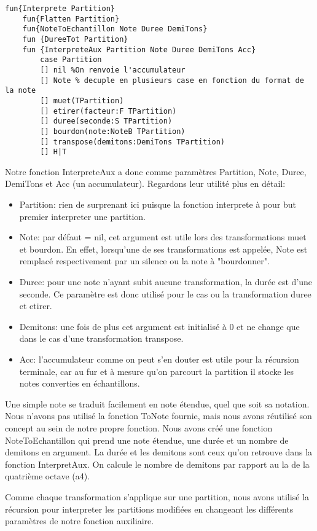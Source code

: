 \documentclass[a4paper,12pt]{report}
\begin{document}
\begin{lstlisting}[frame=single] 
fun{Interprete Partition}
	fun{Flatten Partition}
	fun{NoteToEchantillon Note Duree DemiTons}
	fun {DureeTot Partition}
	fun {InterpreteAux Partition Note Duree DemiTons Acc}
		case Partition
		[] nil %On renvoie l'accumulateur
		[] Note % decuple en plusieurs case en fonction du format de la note
		[] muet(TPartition)
		[] etirer(facteur:F TPartition)
		[] duree(seconde:S TPartition)
		[] bourdon(note:NoteB TPartition)
		[] transpose(demitons:DemiTons TPartition)
		[] H|T			
\end{lstlisting}

Notre fonction InterpreteAux a donc comme paramètres Partition, Note, Duree, DemiTons et Acc (un accumulateur). Regardons leur utilité plus en détail:
\begin{itemize}
\item Partition: rien de surprenant ici puisque la fonction interprete à pour but premier interpreter une partition. 
\item Note: par défaut = nil, cet argument est utile lors des transformations muet et bourdon. En effet, lorsqu'une de ses transformations est appelée, Note est remplacé respectivement par un silence ou la note à "bourdonner".  
\item Duree: pour une note n'ayant subit aucune transformation, la durée est d'une seconde. Ce paramètre est donc utilisé pour le cas ou la transformation duree et etirer.
\item Demitons: une fois de plus cet argument est initialisé à 0 et ne change que dans le cas d'une transformation transpose.
\item Acc: l'accumulateur comme on peut s'en douter est utile pour la récursion terminale, car au fur et à mesure qu'on parcourt la partition il stocke les notes converties en échantillons. 
\end{itemize}

Une simple note se traduit facilement en note étendue, quel que soit sa notation. Nous n'avons pas utilisé la fonction ToNote fournie, mais nous avons réutilisé son concept au sein de notre propre fonction. Nous avons créé une fonction NoteToEchantillon qui prend une note étendue, une durée et un nombre de demitons en argument. La durée et les demitons sont ceux qu'on retrouve dans la fonction InterpretAux. On calcule le nombre de demitons par rapport au la de la quatrième octave (a4).

Comme chaque transformation s'applique sur une partition, nous avons utilisé la récursion pour interpreter les partitions modifiées en changeant les différents paramètres de notre fonction auxiliaire.
\end{document}
